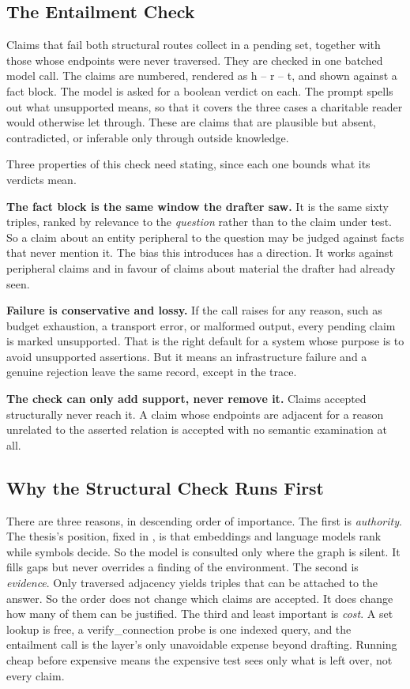\subsection{The Entailment Check}\label{sec:entailment-check}

Claims that fail both structural routes collect in a pending set, together with
those whose endpoints were never traversed. They are checked in one batched
model call. The claims are numbered, rendered as \textsf{h -- r -- t}, and shown
against a fact block. The model is asked for a boolean verdict on each. The
prompt spells out what unsupported means, so that it covers the three cases a
charitable reader would otherwise let through. These are claims that are
plausible but absent, contradicted, or inferable only through outside knowledge.

Three properties of this check need stating, since each one bounds what its
verdicts mean.

\textbf{The fact block is the same window the drafter saw.} It is the same sixty
triples, ranked by relevance to the \emph{question} rather than to the claim
under test. So a claim about an entity peripheral to the question may be judged
against facts that never mention it. The bias this introduces has a direction.
It works against peripheral claims and in favour of claims about material the
drafter had already seen.

\textbf{Failure is conservative and lossy.} If the call raises for any reason,
such as budget exhaustion, a transport error, or malformed output, every pending
claim is marked unsupported. That is the right default for a system whose
purpose is to avoid unsupported assertions. But it means an infrastructure
failure and a genuine rejection leave the same record, except in the trace.

\textbf{The check can only add support, never remove it.} Claims accepted
structurally never reach it. A claim whose endpoints are adjacent for a reason
unrelated to the asserted relation is accepted with no semantic examination at
all.

\subsection{Why the Structural Check Runs First}

There are three reasons, in descending order of importance. The first is
\emph{authority}. The thesis's position, fixed in , is
that embeddings and language models rank while symbols decide. So the model is
consulted only where the graph is silent. It fills gaps but never overrides a
finding of the environment. The second is \emph{evidence}. Only traversed
adjacency yields triples that can be attached to the answer. So the order does
not change which claims are accepted. It does change how many of them can be
justified. The third and least important is \emph{cost}. A set lookup is free, a
\textsf{verify\_connection} probe is one indexed query, and the entailment call
is the layer's only unavoidable expense beyond drafting. Running cheap before
expensive means the expensive test sees only what is left over, not every claim.


